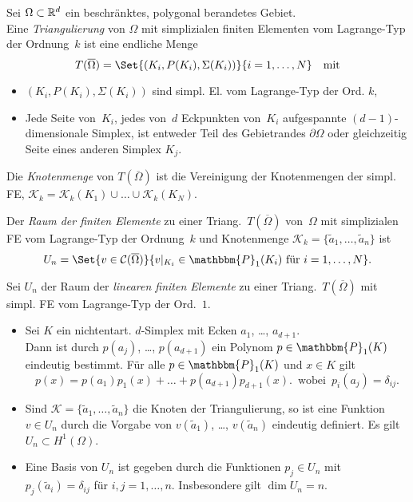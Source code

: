 \documentclass{cheat-sheet}
\newcommand{\Cont}{\mathcal{C}} %
\newcommand{\clos}[1]{\overline{#1}} %
\newcommand{\cOmega}{\clos{\Omega}} %
\newcommand{\bOmega}{\partial \Omega} %
\DeclareMathOperator{\inte}{int} %
\newcommand{\Poly}{\mathbbm{P}} %
\begin{document}
\begin{defn}
  Sei $\Omega \subset \mathbb{R}^d$ ein beschränktes, polygonal berandetes Gebiet. \\
  Eine \emph{Triangulierung} von $\Omega$ mit simplizialen finiten Elementen vom Lagrange-Typ der Ordnung~$k$ ist eine endliche Menge
  \[
    T(\cOmega) = \Set{(K_i, P(K_i), \Sigma(K_i))}{i = 1, \ldots, N}
    \quad \text{mit}
  \]
  \begin{itemize}
    \item $(K_i, P(K_i), \Sigma(K_i))$ sind simpl. El. vom Lagrange-Typ der Ord. $k$,
    \miniitem{0.45 \linewidth}{$\cOmega = K_1 \cup \ldots \cup K_N$,}
    \miniitem{0.48 \linewidth}{$\inte(K_i) \cap \inte(K_j) = \emptyset$ für $i \neq j$,}
    \item Jede Seite von~$K_i$, \dh{} jedes von~$d$ Eckpunkten von~$K_i$ aufgespannte $(d-1)$-dimensionale Simplex, ist entweder Teil des Gebietrandes $\bOmega$ oder gleichzeitig Seite eines anderen Simplex $K_j$.
  \end{itemize}
\end{defn}

\begin{defn}
  Die \textit{Knotenmenge} von $T(\cOmega)$ ist die Vereinigung der Knotenmengen der simpl. FE, \dh{} $\mathcal{K}_k = \mathcal{K}_k(K_1) \cup \ldots \cup \mathcal{K}_k(K_N)$.
\end{defn}

\begin{defn}
  Der \emph{Raum der finiten Elemente} zu einer Triang.~$T(\cOmega)$ von~$\Omega$ mit simplizialen FE vom Lagrange-Typ der Ordnung~$k$ und Knotenmenge $\mathcal{K}_k = \{ \tilde{a}_1, \ldots, \tilde{a}_n \}$ ist
  \[
    U_n = \Set{v \in \Cont(\cOmega)}{v|_{K_i} \in \Poly_1(K_i) \text{ für } i = 1, \ldots, N}.
  \]
\end{defn}

\begin{satz}[$k=1$]
  Sei $U_n$ der Raum der \textit{linearen finiten Elemente} zu einer Triang.~$T(\cOmega)$ mit simpl. FE vom Lagrange-Typ der Ord.~$1$.
  \begin{itemize}
    \item Sei $K$ ein nichtentart. $d$-Simplex mit Ecken $a_1$, \ldots, $a_{d+1}$. \\
    Dann ist durch $p(a_j)$, \ldots, $p(a_{d+1})$ ein Polynom $p \in \Poly_1(K)$ eindeutig bestimmt.
    Für alle $p \in \Poly_1(K)$ und $x \in K$ gilt
    \[
      p(x) = p(a_1) p_1(x) + \ldots + p(a_{d+1}) p_{d+1}(x).
      \enspace \text{wobei} \enspace
      p_i(a_j) = \delta_{ij}.
    \]
    \item Sind $\mathcal{K} = \{ \tilde{a}_1, \ldots, \tilde{a}_n \}$ die Knoten der Triangulierung, so ist eine Funktion $v \in U_n$ durch die Vorgabe von $v(\tilde{a}_1)$, \ldots, $v(\tilde{a}_n)$ eindeutig definiert.
    Es gilt $U_n \subset H^1(\Omega)$.
    \item Eine Basis von $U_n$ ist gegeben durch die Funktionen $p_j \in U_n$ mit $p_j(\tilde{a}_i) = \delta_{ij}$ für $i, j = 1, \ldots, n$.
    Insbesondere gilt $\dim U_n = n$.
  \end{itemize}
\end{satz}
\end{document}
